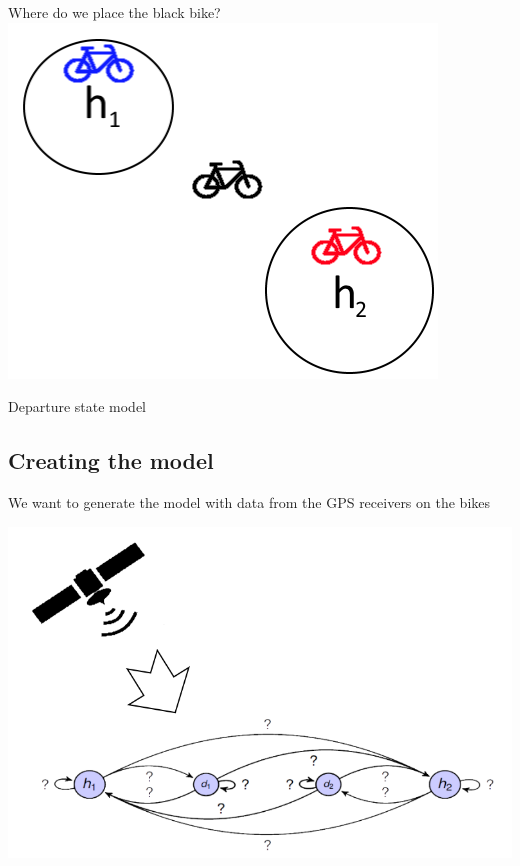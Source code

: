 \begin{frame}
\begin{center}
Where do we place the black bike?	
\includegraphics[scale=0.7]{graphics/world}
\end{center}
\end{frame}

\begin{frame}{Departure state model}

\end{frame}

\subsection{Creating the model}

\begin{frame}{}
	
\begin{center}
We want to generate the model with data from the GPS receivers on the bikes
	
\includegraphics[width=0.8\linewidth]{graphics/build_the_model}
\end{center}

\end{frame}

